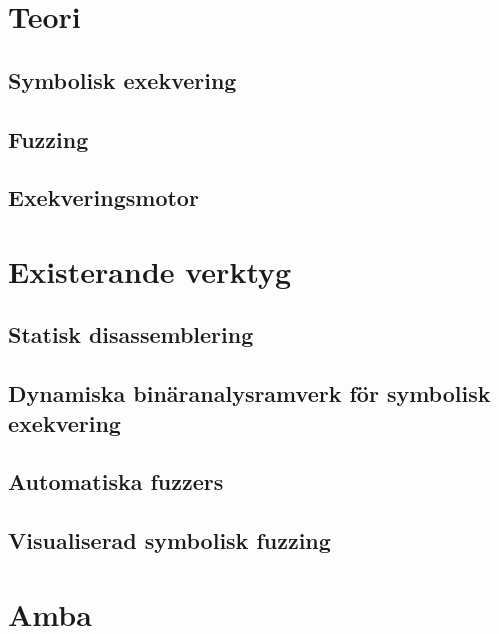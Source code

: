 \documentclass[12pt,a4paper]{report}
\begin{document}
\cleardoublepage
\chapter{Teori}\label{chap:teori}

\section{Symbolisk exekvering}\label{sec:symbolic_execution}

\section{Fuzzing}

\section{Exekveringsmotor}


\cleardoublepage
\chapter{Existerande verktyg}\label{chap:existerande_verktyg}

\section{Statisk disassemblering}\label{sec:existerande-disasm}

\section{Dynamiska binäranalysramverk för symbolisk exekvering}\label{sec:existerande-ramverk}

\section{Automatiska fuzzers}\label{sec:existerande-automatisk}

\section{Visualiserad symbolisk fuzzing}\label{sec:existerande-visualiserad}


\cleardoublepage
\chapter{Amba}\label{chap:amba}

\end{document}
